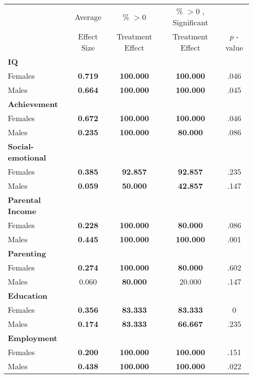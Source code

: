 \begin{tabular}{l c c c c}
\toprule
 & Average & \% $ >0 $ & \% $ >0 $ , Significant & \citet{Rosenbaum_2005_Distribution_JRSS} \\
 & Effect Size & Treatment Effect & Treatment Effect & $ p $ -value \\
\midrule
\textbf{IQ} & & & & \\
\quad Females &  \textbf{    0.719} & \textbf{  100.000} & \textbf{  100.000} & .046 \\
\quad Males &  \textbf{    0.664} & \textbf{  100.000} & \textbf{  100.000} & .045 \\
\midrule
\textbf{Achievement} & & & & \\
\quad Females &  \textbf{    0.672} & \textbf{  100.000} & \textbf{  100.000} & .046 \\
\quad Males &  \textbf{    0.235} & \textbf{  100.000} & \textbf{   80.000} & .086 \\
\midrule
\textbf{Social-emotional} & & & & \\
\quad Females &  \textbf{    0.385} & \textbf{   92.857} & \textbf{   92.857} & .235 \\
\quad Males &  \textbf{    0.059} & \textbf{   50.000} & \textbf{   42.857} & .147 \\
\midrule
\textbf{Parental Income} & & & & \\
\quad Females &  \textbf{    0.228} & \textbf{  100.000} & \textbf{   80.000} & .086 \\
\quad Males &  \textbf{    0.445} & \textbf{  100.000} & \textbf{  100.000} & .001 \\
\midrule
\textbf{Parenting} & & & & \\
\quad Females &  \textbf{    0.274} & \textbf{  100.000} & \textbf{   80.000} & .602 \\
\quad Males &      0.060 & \textbf{   80.000} &    20.000 & .147 \\
\midrule
\textbf{Education} & & & & \\
\quad Females &  \textbf{    0.356} & \textbf{   83.333} & \textbf{   83.333} & 0 \\
\quad Males &  \textbf{    0.174} & \textbf{   83.333} & \textbf{   66.667} & .235 \\
\midrule
\textbf{Employment} & & & & \\
\quad Females &  \textbf{    0.200} & \textbf{  100.000} & \textbf{  100.000} & .151 \\
\quad Males &  \textbf{    0.438} & \textbf{  100.000} & \textbf{  100.000} & .022 \\

\end{tabular}
